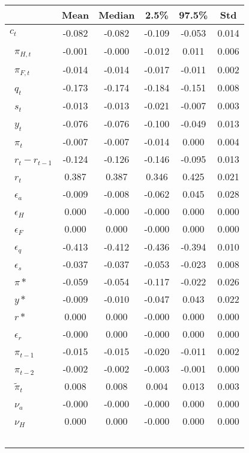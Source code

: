 \begin{small}\begin{tabular}{lccccc}
\hline
&\textbf{Mean}&\textbf{Median}&\textbf{2.5\%}&\textbf{97.5\%}&\textbf{Std}\\\hline
\textbf{$ c_{t}            $}&-0.082&-0.082&-0.109&-0.053&0.014\\\
\textbf{$ \pi_{H,t}        $}&-0.001&-0.000&-0.012&0.011&0.006\\\
\textbf{$ \pi_{F,t}        $}&-0.014&-0.014&-0.017&-0.011&0.002\\\
\textbf{$ q_{t}            $}&-0.173&-0.174&-0.184&-0.151&0.008\\\
\textbf{$ s_{t}            $}&-0.013&-0.013&-0.021&-0.007&0.003\\\
\textbf{$ y_{t}            $}&-0.076&-0.076&-0.100&-0.049&0.013\\\
\textbf{$ \pi_{t}          $}&-0.007&-0.007&-0.014&0.000&0.004\\\
\textbf{$ r_{t} - r_{t-1}  $}&-0.124&-0.126&-0.146&-0.095&0.013\\\
\textbf{$ r_{t}            $}&0.387&0.387&0.346&0.425&0.021\\\
\textbf{$ \epsilon_{a}     $}&-0.009&-0.008&-0.062&0.045&0.028\\\
\textbf{$ \epsilon_{H}     $}&0.000&-0.000&-0.000&0.000&0.000\\\
\textbf{$ \epsilon_{F}     $}&0.000&0.000&-0.000&0.000&0.000\\\
\textbf{$ \epsilon_{q}     $}&-0.413&-0.412&-0.436&-0.394&0.010\\\
\textbf{$ \epsilon_{s}     $}&-0.037&-0.037&-0.053&-0.023&0.008\\\
\textbf{$ \pi*             $}&-0.059&-0.054&-0.117&-0.022&0.026\\\
\textbf{$ y*               $}&-0.009&-0.010&-0.047&0.043&0.022\\\
\textbf{$ r*               $}&0.000&0.000&-0.000&0.000&0.000\\\
\textbf{$ \epsilon_{r}     $}&-0.000&0.000&-0.000&0.000&0.000\\\
\textbf{$ \pi_{t-1}        $}&-0.015&-0.015&-0.020&-0.011&0.002\\\
\textbf{$ \pi_{t-2}        $}&-0.002&-0.002&-0.003&-0.001&0.000\\\
\textbf{$ \tilde{\pi}_{t}  $}&0.008&0.008&0.004&0.013&0.003\\\
\textbf{$ \nu_{a}          $}&-0.000&-0.000&-0.000&0.000&0.000\\\
\textbf{$ \nu_{H}          $}&0.000&0.000&-0.000&0.000&0.000\\\

\end{tabular}
\end{small}
